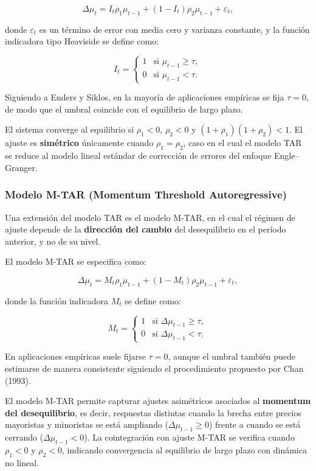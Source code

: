 \documentclass[
  12pt,
]{article}
\begin{document}
\[
\Delta \mu_t 
= I_t \rho_1 \mu_{t-1}
+ (1 - I_t)\rho_2 \mu_{t-1}
+ \varepsilon_t,
\]

donde \(\varepsilon_t\) es un término de error con media cero y varianza
constante, y la función indicadora tipo Heaviside se define como:

\[
I_t =
\begin{cases}
1 & \text{si } \mu_{t-1} \ge \tau, \\
0 & \text{si } \mu_{t-1} < \tau.
\end{cases}
\]

Siguiendo a Enders y Siklos, en la mayoría de aplicaciones empíricas se
fija \(\tau = 0\), de modo que el umbral coincide con el equilibrio de
largo plazo.

El sistema converge al equilibrio si \(\rho_1 < 0\), \(\rho_2 < 0\) y
\((1+\rho_1)(1+\rho_2) < 1\). El ajuste es \textbf{simétrico} únicamente
cuando \(\rho_1 = \rho_2\), caso en el cual el modelo TAR se reduce al
modelo lineal estándar de corrección de errores del enfoque
Engle--Granger.

\subsubsection{Modelo M-TAR (Momentum Threshold
Autoregressive)}\label{modelo-m-tar-momentum-threshold-autoregressive}

Una extensión del modelo TAR es el modelo M-TAR, en el cual el régimen
de ajuste depende de la \textbf{dirección del cambio} del desequilibrio
en el período anterior, y no de su nivel.

El modelo M-TAR se especifica como:

\[
\Delta \mu_t 
= M_t \rho_1 \mu_{t-1}
+ (1 - M_t)\rho_2 \mu_{t-1}
+ \varepsilon_t,
\]

donde la función indicadora \(M_t\) se define como:

\[
M_t =
\begin{cases}
1 & \text{si } \Delta \mu_{t-1} \ge \tau, \\
0 & \text{si } \Delta \mu_{t-1} < \tau.
\end{cases}
\]

En aplicaciones empíricas suele fijarse \(\tau = 0\), aunque el umbral
también puede estimarse de manera consistente siguiendo el procedimiento
propuesto por Chan (1993).

El modelo M-TAR permite capturar ajustes asimétricos asociados al
\textbf{momentum del desequilibrio}, es decir, respuestas distintas
cuando la brecha entre precios mayoristas y minoristas se está ampliando
(\(\Delta \mu_{t-1} \ge 0\)) frente a cuando se está cerrando
(\(\Delta \mu_{t-1} < 0\)). La cointegración con ajuste M-TAR se
verifica cuando \(\rho_1 < 0\) y \(\rho_2 < 0\), indicando convergencia
al equilibrio de largo plazo con dinámica no lineal.
\end{document}
